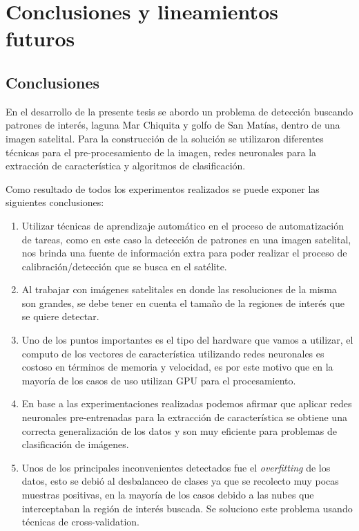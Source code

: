\chapter{Conclusiones y lineamientos futuros}\label{chap:conclusiones}


\section{Conclusiones}
En el desarrollo de la presente tesis se abordo un problema de detección buscando patrones de interés, laguna Mar Chiquita y golfo de San Matías, dentro de una imagen satelital. Para la construcción de la solución se utilizaron diferentes técnicas para el pre-procesamiento de la imagen, redes neuronales para la extracción de característica y algoritmos de clasificación. 

Como resultado de todos los experimentos realizados se puede exponer las siguientes conclusiones:

\begin{enumerate}
\item Utilizar técnicas de aprendizaje automático en el proceso de automatización de tareas, como en este caso la detección de patrones en una imagen satelital, nos brinda una fuente de información extra para poder realizar el proceso de calibración/detección que se busca en el satélite. 

\item Al trabajar con imágenes satelitales en donde las resoluciones de la misma son grandes, se debe tener en cuenta el tamaño de la regiones de interés que se quiere detectar.

\item Uno de los puntos importantes es el tipo del hardware que vamos a utilizar, el computo de los vectores de característica utilizando redes neuronales es costoso en términos de memoria y velocidad, es por este motivo que en la mayoría de los casos de uso utilizan GPU para el procesamiento.

\item En base a las experimentaciones realizadas podemos afirmar que aplicar redes neuronales pre-entrenadas para la extracción de característica se obtiene una correcta generalización de los datos y son muy eficiente para problemas de clasificación de imágenes.

\item Unos de los principales inconvenientes detectados fue el \textit{overfitting} de los datos, esto se debió al desbalanceo de clases ya que se recolecto muy pocas muestras positivas, en la mayoría de los casos debido a las nubes que interceptaban la región de interés buscada. Se soluciono este problema usando técnicas de cross-validation.

\end{enumerate}

